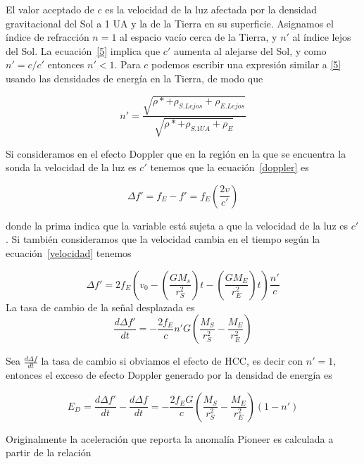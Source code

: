 El valor aceptado de $c$ es la velocidad de la luz afectada por la densidad gravitacional del Sol a 1 UA y la de la Tierra en su superficie. Asignamos el índice de refracción $n=1$ al espacio vacío cerca de la Tierra, y $n'$ al índice lejos del Sol. La ecuación~\ref{5} implica que $c'$ aumenta al alejarse del Sol, y como $n'=c/c'$ entonces $n'<1$. Para $c$ podemos escribir una expresión similar a \eqref{5} usando las densidades de energía en la Tierra, de modo que 

\begin{equation} \label{7}
    n'=\frac{\sqrt{\rho*+\rho_{S.Lejos}+\rho_{E.Lejos}}}{\sqrt{\rho*+\rho_{S.1UA}+\rho_{E}}}
\end{equation}

Si consideramos en el efecto Doppler que en la región en la que se encuentra la sonda la velocidad de la luz es $c'$ tenemos que la ecuación~\ref{doppler} es

\begin{equation}
    \Delta f' = f_E - f' = f_E \left( \frac{2v}{c'} \right)
\end{equation}

donde la prima indica que la variable está sujeta a que la velocidad de la luz es $c'$. Si también consideramos que la velocidad cambia en el tiempo según la ecuación~\ref{velocidad} tenemos 

\begin{equation}
    \Delta f' = 2 f_E \left( v_0 - \left( \frac{G M_s}{r_S^2} \right) t- \left( \frac{GM_E}{r_E^2}\right)t \right) \frac{n'}{c}
\end{equation}
 La tasa de cambio de la señal desplazada es
 \begin{equation}
     \frac{d \Delta f'}{d t} = -\frac{2f_E}{c} n' G \left(\frac{ M_S}{r_S^2} - \frac{M_E}{r_E^2} \right)
 \end{equation}

Sea $\frac{d\Delta f}{dt}$ la tasa de cambio si obviamos el efecto de \ac{HCC}, es decir con $n'=1$, entonces el exceso de efecto Doppler generado por la densidad de energía es

\begin{equation} \label{17}
    E_D = \frac{d\Delta f'}{dt} -\frac{d\Delta f}{dt} = -\frac{2f_E G}{c} \left(\frac{ M_S}{r_S^2} - \frac{M_E}{r_E^2} \right) (1-n')
\end{equation}

Originalmente la aceleración que reporta la anomalía Pioneer es calculada a partir de la relación

